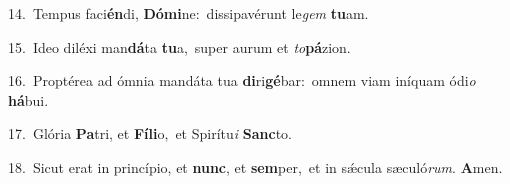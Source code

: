 {\numbfont\textcolor{\numbcolor}{14.}}~Tempus faci\-\textbf{én}\-di, \textbf{Dó}\-\textbf{mi}ne:~\star dissipavérunt le\textit{gem} \textbf{tu}\-am.\par
{\numbfont\textcolor{\numbcolor}{15.}}~Ideo diléxi man\-\textbf{dá}\-ta \textbf{tu}\-a,~\star super aurum et \textit{to}\-\textbf{pá}zion.\par
{\numbfont\textcolor{\numbcolor}{16.}}~Proptérea ad ómnia mandáta tua \textbf{di}\-ri\-\textbf{gé}\-bar:~\star omnem viam iníquam ódi\textit{o} \textbf{há}\-bui.\par
{\numbfont\textcolor{\numbcolor}{17.}}~Glória \textbf{Pa}\-tri, et \textbf{Fí}\-\textbf{li}o,~\star et Spirítu\textit{i} \textbf{Sanc}\-to.\par
{\numbfont\textcolor{\numbcolor}{18.}}~Sicut erat in princípio, et \textbf{nunc}\-, et \textbf{sem}\-per,~\star et in sǽcula sæculó\-\textit{rum}\-. \textbf{A}\-men.\par

